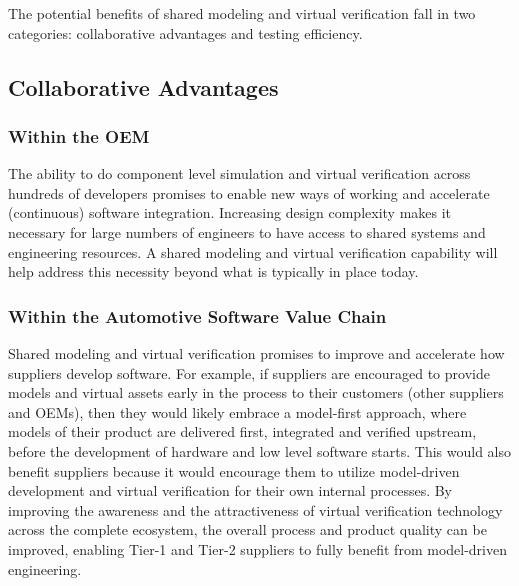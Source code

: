 The potential benefits of shared modeling and virtual verification fall in two categories:
collaborative advantages and testing efficiency.


\subsection{Collaborative Advantages}
\subsubsection{Within the OEM}
The ability to do component level simulation and virtual verification across hundreds of developers promises to enable new ways of working and accelerate (continuous) software integration.
Increasing design complexity makes it necessary for large numbers of engineers to have access to shared systems and engineering resources. A shared modeling and virtual verification capability will help address this necessity beyond what is typically in place today.

\subsubsection{Within the Automotive Software Value Chain}
Shared modeling and virtual verification promises to improve and accelerate how suppliers develop software. For example, if suppliers are encouraged to provide models and virtual assets early in the process to their customers (other suppliers and OEMs), then they would likely embrace a model-first approach, where models of their product are delivered first, integrated and verified upstream, before the development of hardware and low level software starts. This would also benefit suppliers because it would encourage them to utilize model-driven development and virtual verification for their own internal processes.
By improving the awareness and the attractiveness of virtual verification technology across the complete ecosystem, the overall process and product quality can be improved, enabling Tier-1 and Tier-2 suppliers to fully benefit from model-driven engineering.

